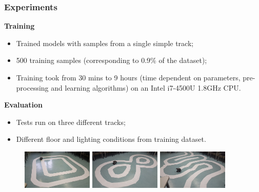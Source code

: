 \documentclass{beamer}
\begin{document}
\begin{frame}
  \frametitle{Experiments}

  \textbf{Training}
  \begin{itemize}
    \item Trained models with samples from a single simple track;
    \item 500 training samples (corresponding to 0.9\% of the dataset);
    \item Training took from 30 mins to 9 hours (time dependent on parameters, pre-processing and
      learning algorithms) on an Intel i7-4500U 1.8GHz CPU.
  \end{itemize}

  \textbf{Evaluation}
  \begin{itemize}
    \item Tests run on three different tracks;
    \item Different floor and lighting conditions from training dataset.
  \end{itemize}

  \begin{figure}
    \centering\includegraphics[width=0.3\textwidth]{imgs/track_0.png}
    \includegraphics[width=0.3\textwidth]{imgs/track_1.png}
    \includegraphics[width=0.3\textwidth]{imgs/track_2.png}
  \end{figure}
\end{frame}
\end{document}

